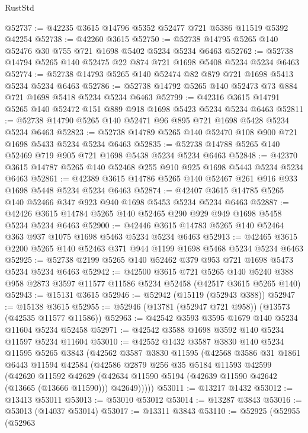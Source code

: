 \begin{lexlean}{RustStd}
\begin{coremodule}
@52737 := @42235 @3615 @14796 @5352 @52477 @721 @5386 @11519 @5392 @42254
@52738 := @42260 @3615
@52750 := @52738 @14795 @5265 @140 @52476 @30 @755 @721 @1698 @5402 @5234 @5234 @6463
@52762 := @52738 @14794 @5265 @140 @52475 @22 @874 @721 @1698 @5408 @5234 @5234 @6463
@52774 := @52738 @14793 @5265 @140 @52474 @82 @879 @721 @1698 @5413 @5234 @5234 @6463
@52786 := @52738 @14792 @5265 @140 @52473 @73 @884 @721 @1698 @5418 @5234 @5234 @6463
@52799 := @42316 @3615 @14791 @5265 @140 @52472 @151 @889 @918 @1698 @5423 @5234 @5234 @6463
@52811 := @52738 @14790 @5265 @140 @52471 @96 @895 @721 @1698 @5428 @5234 @5234 @6463
@52823 := @52738 @14789 @5265 @140 @52470 @108 @900 @721 @1698 @5433 @5234 @5234 @6463
@52835 := @52738 @14788 @5265 @140 @52469 @719 @905 @721 @1698 @5438 @5234 @5234 @6463
@52848 := @42370 @3615 @14787 @5265 @140 @52468 @255 @910 @925 @1698 @5443 @5234 @5234 @6463
@52861 := @42389 @3615 @14786 @5265 @140 @52467 @261 @916 @933 @1698 @5448 @5234 @5234 @6463
@52874 := @42407 @3615 @14785 @5265 @140 @52466 @347 @923 @940 @1698 @5453 @5234 @5234 @6463
@52887 := @42426 @3615 @14784 @5265 @140 @52465 @290 @929 @949 @1698 @5458 @5234 @5234 @6463
@52900 := @42446 @3615 @14783 @5265 @140 @52464 @363 @937 @1075 @1698 @5463 @5234 @5234 @6463
@52913 := @42465 @3615 @2200 @5265 @140 @52463 @371 @944 @1199 @1698 @5468 @5234 @5234 @6463
@52925 := @52738 @2199 @5265 @140 @52462 @379 @953 @721 @1698 @5473 @5234 @5234 @6463
@52942 := @42500
    @3615
    @721
    @5265
    @140
    @5240
    @388
    @958
    @2873
    @3597
    @11577
    @11586
    @5234
    @52458
    (@42517 @3615 @5265 @140)
@52943 := @15131 @3615
@52946 := @52942 (@15119 (@52943 @388))
@52947 := @15138 @3615
@52955 := @52946 (@13781 (@52947 @721 @958)) (@13573 (@42535 @11577 @11586))
@52963 := @42542 @3593 @3595 @1679 @140 @5234 @11604 @5234 @52458
@52971 := @42542 @3588 @1698 @3592 @140 @5234 @11597 @5234 @11604
@53010 := @42552
    @1432
    @3587
    @3830
    @140
    @5234
    @11595
    @5265
    @3843
    (@42562
      @3587
      @3830
      @11595
      (@42568
        @3586
        @31
        @1861
        @6443
        @11594
        @42584
        (@42586
          @2879
          @256
          @35
          @5184
          @11593
          @42599
          (@42620
            @11592
            @42629
            (@42634 @11590 @5194 (@42639 @11590 @42642 (@13665 (@13666 @11590))) @42649)))))
@53011 := @13217 @1432
@53012 := @13413 @53011
@53013 := @53010 @53012
@53014 := @13287 @3843
@53016 := @53013 (@14037 @53014)
@53017 := @13311 @3843
@53110 := @52925
    (@52955
      (@52963

\end{coremodule}
\end{lexlean}

